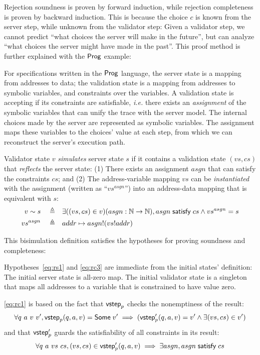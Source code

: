 Rejection soundness is proven by forward induction, while rejection completeness
is proven by backward induction.  This is because the choice $c$ is known from
the server step, while unknown from the validator step: Given a validator step,
we cannot predict ``what choices the server will make in the future'', but can
analyze ``what choices the server might have made in the past''.  This proof
method is further explained with the $\mathsf{Prog}$ example:

For specifications written in the $\mathsf{Prog}$ language, the server state is a
mapping from addresses to data; the validation state is a mapping from addresses
to symbolic variables, and constraints over the variables.  A validation state
is accepting if its constraints are satisfiable, {\it i.e.}  there exists an
{\em assignment} of the symbolic variables that can unify the trace with the
server model.  The internal choices made by the server are represented as
symbolic variables.  The assignment maps these variables to the choices' value
at each step, from which we can reconstruct the server's execution path.
\begin{definition}
  Validator state $v$ {\em simulates} server state $s$ if it contains a
  validation state $(vs,cs)$ that {\em reflects} the server state: (1) There
  exists an assignment $asgn$ that can satisfy the constraints $cs$; and (2) The
  address-variable mapping $vs$ can be {\em instantiated} with the assignment
  (written as ``$vs^{asgn}$'') into an address-data mapping that is equivalent
  with $s$:
  \begin{align*}
    v\sim s\quad\triangleq\quad& \exists((vs,cs)\in v)(asgn:\mathbb N\to\mathbb N),asgn\;\mathsf{satisfy}\;cs\wedge vs^{asgn}=s\\ vs^{asgn}\quad\triangleq\quad&addr\mapsto
    asgn!(vs!addr)
  \end{align*}
\end{definition}
This bisimulation definition satisfies the hypotheses for proving soundness and
completeness:

Hypotheses~\ref{eq:rs1} and \ref{eq:rc3} are immediate from the initial states'
definition: The initial server state is all-zero map.  The initial validator
state is a singleton that maps all addresses to a variable that is constrained
to have value zero.

\autoref{eq:rc1} is based on the fact that $\mathsf{vstep}_p$ checks the nonemptiness of
the result:
\[\forall q~a~v~v',\mathsf{vstep}_p(q,a,v)=\mathsf{Some}\;v'\implies(\mathsf{vstep}_p'(q,a,v)=v'\wedge\exists (vs,cs)\in v')\]
and that $\mathsf{vstep}_p'$ guards the satisfiability of all constraints in its result:
\[\forall q~a~vs~cs,{(vs,cs)}\in\mathsf{vstep}_p'(q,a,v)\implies\exists asgn,asgn\;\mathsf{satisfy}\;cs\]

